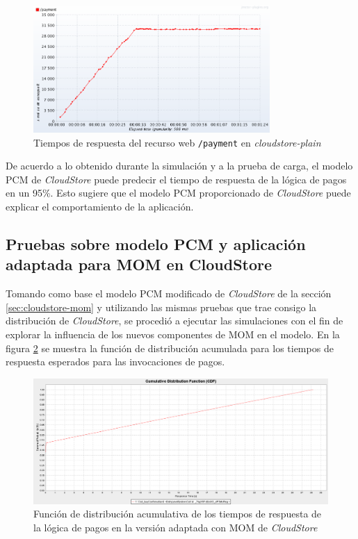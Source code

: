 \documentclass[article]{IEEEtran}
\begin{document}
\begin{figure}[h]
  \centering
  \includegraphics[width=9cm]{cloudstore-plain-aws-1}
  \caption{\small{Tiempos de respuesta del recurso web \texttt{/payment} en \emph{cloudstore-plain}}}
  \label{fig:cloudstore-jmeter-plain-1}
\end{figure}

De acuerdo a lo obtenido durante la simulación y a la prueba de carga, el modelo PCM de \emph{CloudStore} puede predecir el tiempo de respuesta de la lógica de pagos en un 95\%. Esto sugiere que el modelo PCM proporcionado de \emph{CloudStore} puede explicar el comportamiento de la aplicación.

\subsection{Pruebas sobre modelo PCM y aplicación adaptada para MOM en CloudStore}
Tomando como base el modelo PCM modificado de \emph{CloudStore} de la sección \ref{sec:cloudstore-mom} y utilizando las mismas pruebas que trae consigo la distribución de \emph{CloudStore}, se procedió a ejecutar las simulaciones con el fin de explorar la influencia de los nuevos componentes de MOM en el modelo. En la figura \ref{fig:cloudstore-pcm-jms-1} se muestra la función de distribución acumulada para los tiempos de respuesta esperados para las invocaciones de pagos.

\begin{figure}[h]
  \centering
  \includegraphics[width=17cm]{cloudstore-palladio-jms-cdf-1.png}
  \caption{\small{Función de distribución acumulativa de los tiempos de respuesta de la lógica de pagos en la versión adaptada con MOM de \emph{CloudStore}}}
  \label{fig:cloudstore-pcm-jms-1}
\end{figure}
\end{document}
